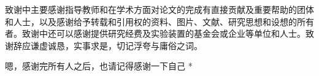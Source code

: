 \acknowledgments

致谢中主要感谢指导教师和在学术方面对论文的完成有直接贡献及重要帮助的团体和人士，以及感谢给予转载和引用权的资料、图片、文献、研究思想和设想的所有者。致谢中还可以感谢提供研究经费及实验装置的基金会或企业等单位和人士。致谢辞应谦虚诚恳，实事求是，切记浮夸与庸俗之词。

\par * 嗯，感谢完所有人之后，也请记得感谢一下自己 * \par
